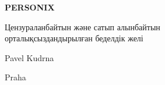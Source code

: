 \thispagestyle{empty}
\begin{center}
  {\sffamily\bfseries\fontsize{34}{40}\selectfont PERSONIX\par}
  \vspace{2.2em}
  {\rmfamily\large Цензураланбайтын және сатып алынбайтын\\[0.25em]
   орталықсыздандырылған беделдік желі\par}
\end{center}
\begin{center}
  {\rmfamily\Large Pavel Kudrna\par}
  \vspace{0.45em}
  {\rmfamily\small Praha\quad\textbullet{}\par}
\end{center}
\clearpage
